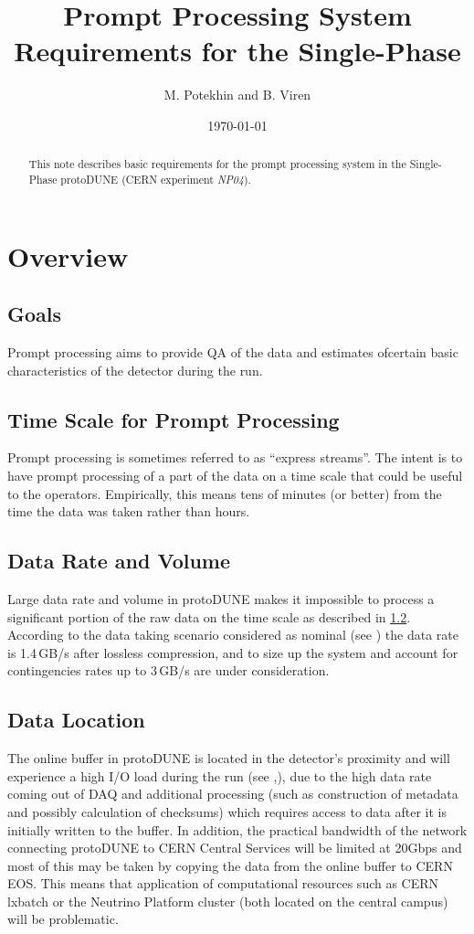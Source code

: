 \documentclass[pdftex,12pt,letter]{article}
\title{Prompt Processing System Requirements for the Single-Phase \pd}
\date{\today}
\author{M. Potekhin and B. Viren}
\newcommand{\pd}{protoDUNE\xspace}
\newcommand{\expname}{\textit{NP04}\xspace}
\begin{document}
\maketitle

\begin{abstract}
\noindent  This note describes basic requirements for the prompt processing system in the Single-Phase \pd
(CERN experiment \expname).
\end{abstract}

\section{Overview}
\subsection{Goals}
\label{sec:goals}
Prompt processing aims to provide QA of the data and estimates ofcertain  basic characteristics of the detector during the run.


\subsection{Time Scale for Prompt Processing}
\label{sec:timescale}
 Prompt processing is sometimes referred to as ``express streams''.
The intent is to have prompt processing of a part of the data on a time scale that could be useful to the operators.
Empirically, this means tens of minutes (or better) from the time the data was taken rather than hours.

\subsection{Data Rate and Volume}
\label{sec:datavolume}
Large data rate and volume in \pd makes it impossible to process a significant portion of the raw data on the time scale as described in \ref{sec:timescale}.
According to the data taking scenario considered as nominal (see \cite{docdb1086}) the data rate is 1.4\,GB/s after lossless compression, and to size up
the system and account for contingencies rates up to 3\,GB/s are under consideration.

\subsection{Data Location}
\label{sec:datalocation}
The online buffer in \pd is located in the detector's proximity and will experience a high I/O load during the run (see \cite{docdb1086},\cite{docdb1212}), due
to the high data rate coming out of DAQ and additional processing (such as construction of metadata and possibly calculation of checksums) which requires
access to data after it is initially written to the buffer. In addition, the practical bandwidth of the network connecting \pd to CERN Central Services will be limited at 20Gbps
and most of this may be taken by copying the data from the online buffer to CERN EOS. This means that application of computational resources such as CERN lxbatch
or the Neutrino Platform cluster (both located on the central campus) will be problematic.
\end{document}
